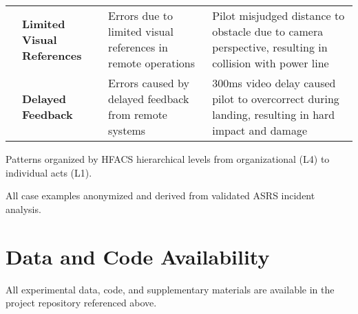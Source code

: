 \begin{table*}[!htbp]
\begin{adjustbox}{width=\textwidth,center}
\begin{threeparttable}
\begin{tabular}{@{}p{2.0cm}p{3.5cm}p{5.0cm}p{4.5cm}@{}}
& \textbf{Limited Visual References}
& Errors due to limited visual references in remote operations
& Pilot misjudged distance to obstacle due to camera perspective, resulting in collision with power line \\
\addlinespace[0.2ex]

& \textbf{Delayed Feedback}
& Errors caused by delayed feedback from remote systems
& 300ms video delay caused pilot to overcorrect during landing, resulting in hard impact and damage \\

\bottomrule
\end{tabular}
\begin{tablenotes}
\footnotesize
\item Patterns organized by HFACS hierarchical levels from organizational (L4) to individual acts (L1).
\item All case examples anonymized and derived from validated ASRS incident analysis.
\end{tablenotes}
\end{threeparttable}
\end{adjustbox}
\end{table*}

\section{Data and Code Availability}
\label{appendix:data_code}

All experimental data, code, and supplementary materials are available in the project repository referenced above.
